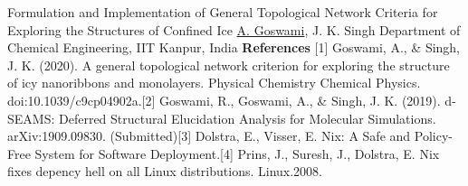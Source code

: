 \begin{abstract_online}{Formulation and Implementation of General Topological Network Criteria for Exploring the Structures of Confined Ice}{%
        \underline{A. Goswami}, J. K. Singh}{%
        }{%
        Department of Chemical Engineering, IIT Kanpur, India}
        \textbf{References} \newline{}[1] Goswami, A., & Singh, J. K. (2020). A general topological network criterion for exploring the structure of icy nanoribbons and monolayers. Physical Chemistry Chemical Physics. doi:10.1039/c9cp04902a.\newline{}[2] Goswami, R., Goswami, A., & Singh, J. K. (2019). d-SEAMS: Deferred Structural Elucidation Analysis for Molecular Simulations. arXiv:1909.09830. (Submitted)\newline{}[3] Dolstra, E., Visser, E. Nix: A Safe and Policy-Free System for Software Deployment.\newline{}[4] Prins, J., Suresh, J., Dolstra, E. Nix fixes depency hell on all Linux distributions. Linux.\newline{}2008.
    \end{abstract_online}
    